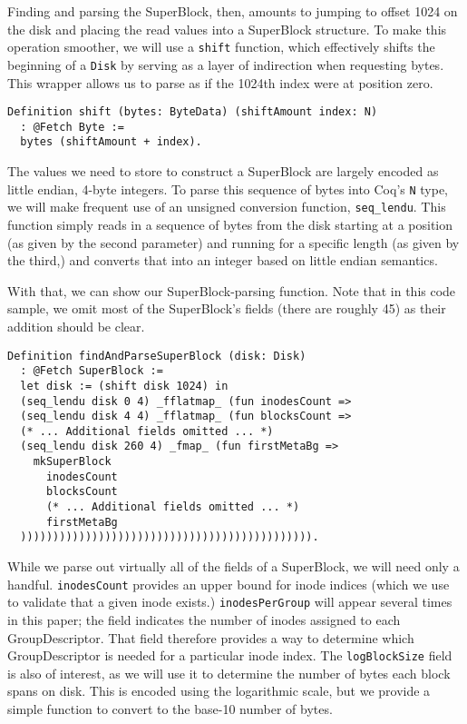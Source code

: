 \documentclass[nocopyrightspace,preprint]{sigplanconf}
\begin{document}
Finding and parsing the SuperBlock, then, amounts to jumping to offset 1024 on
the disk and placing the read values into a SuperBlock structure. To make this
operation smoother, we will use a {\tt shift} function, which effectively
shifts the beginning of a {\tt Disk} by serving as a layer of indirection when
requesting bytes. This wrapper allows us to parse as if the 1024th index were
at position zero.

\begin{lstlisting}
Definition shift (bytes: ByteData) (shiftAmount index: N)
  : @Fetch Byte :=
  bytes (shiftAmount + index).
\end{lstlisting}

The values we need to store to construct a SuperBlock are largely encoded as
little endian, 4-byte integers. To parse this sequence of bytes into Coq's
{\tt N} type, we will make frequent use of an unsigned conversion function,
{\tt seq\_lendu}. This function simply reads in a sequence of bytes from the
disk starting at a position (as given by the second parameter) and running for
a specific length (as given by the third,) and converts that into an integer
based on little endian semantics. 

With that, we can show our SuperBlock-parsing function. Note that in this code
sample, we omit most of the SuperBlock's fields (there are roughly 45) as
their addition should be clear.

\begin{lstlisting}
Definition findAndParseSuperBlock (disk: Disk)
  : @Fetch SuperBlock :=
  let disk := (shift disk 1024) in
  (seq_lendu disk 0 4) _fflatmap_ (fun inodesCount =>
  (seq_lendu disk 4 4) _fflatmap_ (fun blocksCount =>
  (* ... Additional fields omitted ... *)
  (seq_lendu disk 260 4) _fmap_ (fun firstMetaBg =>
    mkSuperBlock
      inodesCount
      blocksCount
      (* ... Additional fields omitted ... *)
      firstMetaBg
  ))))))))))))))))))))))))))))))))))))))))))))).
\end{lstlisting}

While we parse out virtually all of the fields of a SuperBlock, we will need
only a handful. {\tt inodesCount} provides an upper bound for inode indices
(which we use to validate that a given inode exists.) {\tt inodesPerGroup}
will appear several times in this paper; the field indicates the number of
inodes assigned to each GroupDescriptor. That field therefore provides a way
to determine which GroupDescriptor is needed for a particular inode index. The
{\tt logBlockSize} field is also of interest, as we will use it to determine
the number of bytes each block spans on disk. This is encoded using the
logarithmic scale, but we provide a simple function to convert to the base-10
number of bytes.
\end{document}
